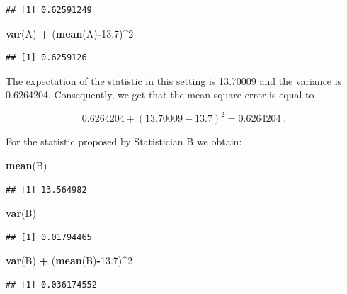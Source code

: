 \documentclass[]{krantz}
\makeatletter
\newenvironment{Shaded}{\begin{snugshade}}{\end{snugshade}}
\newcommand{\KeywordTok}[1]{\textcolor[rgb]{0.13,0.29,0.53}{\textbf{#1}}}
\newcommand{\DecValTok}[1]{\textcolor[rgb]{0.00,0.00,0.81}{#1}}
\newcommand{\FloatTok}[1]{\textcolor[rgb]{0.00,0.00,0.81}{#1}}
\newcommand{\StringTok}[1]{\textcolor[rgb]{0.31,0.60,0.02}{#1}}
\newcommand{\OperatorTok}[1]{\textcolor[rgb]{0.81,0.36,0.00}{\textbf{#1}}}
\newcommand{\NormalTok}[1]{#1}
\newenvironment{kframe}{%
\medskip{}
\setlength{\fboxsep}{.8em}
 \def\at@end@of@kframe{}%
 \ifinner\ifhmode%
  \def\at@end@of@kframe{\end{minipage}}%
  \begin{minipage}{\columnwidth}%
 \fi\fi%
 \def\FrameCommand##1{\hskip\@totalleftmargin \hskip-\fboxsep
 \colorbox{shadecolor}{##1}\hskip-\fboxsep
     \hskip-\linewidth \hskip-\@totalleftmargin \hskip\columnwidth}%
 \MakeFramed {\advance\hsize-\width
   \@totalleftmargin\z@ \linewidth\hsize
   \@setminipage}}%
 {\par\unskip\endMakeFramed%
 \at@end@of@kframe}
\renewenvironment{Shaded}{\begin{kframe}}{\end{kframe}}
\theoremstyle{definition}
\theoremstyle{definition}
\theoremstyle{definition}
\theoremstyle{remark}
\makeatother
\begin{document}
\begin{verbatim}
## [1] 0.62591249
\end{verbatim}

\begin{Shaded}
\begin{Highlighting}[]
\KeywordTok{var}\NormalTok{(A) }\OperatorTok{+}\StringTok{ }\NormalTok{(}\KeywordTok{mean}\NormalTok{(A)}\OperatorTok{-}\FloatTok{13.7}\NormalTok{)}\OperatorTok{^}\DecValTok{2}
\end{Highlighting}
\end{Shaded}

\begin{verbatim}
## [1] 0.6259126
\end{verbatim}

The expectation of the statistic in this setting is 13.70009 and the
variance is 0.6264204. Consequently, we get that the mean square error
is equal to

\[0.6264204 + (13.70009 - 13.7)^2 = 0.6264204\;.\]

For the statistic proposed by Statistician B we obtain:

\begin{Shaded}
\begin{Highlighting}[]
\KeywordTok{mean}\NormalTok{(B)}
\end{Highlighting}
\end{Shaded}

\begin{verbatim}
## [1] 13.564982
\end{verbatim}

\begin{Shaded}
\begin{Highlighting}[]
\KeywordTok{var}\NormalTok{(B)}
\end{Highlighting}
\end{Shaded}

\begin{verbatim}
## [1] 0.01794465
\end{verbatim}

\begin{Shaded}
\begin{Highlighting}[]
\KeywordTok{var}\NormalTok{(B) }\OperatorTok{+}\StringTok{ }\NormalTok{(}\KeywordTok{mean}\NormalTok{(B)}\OperatorTok{-}\FloatTok{13.7}\NormalTok{)}\OperatorTok{^}\DecValTok{2}
\end{Highlighting}
\end{Shaded}

\begin{verbatim}
## [1] 0.036174552
\end{verbatim}
\end{document}

